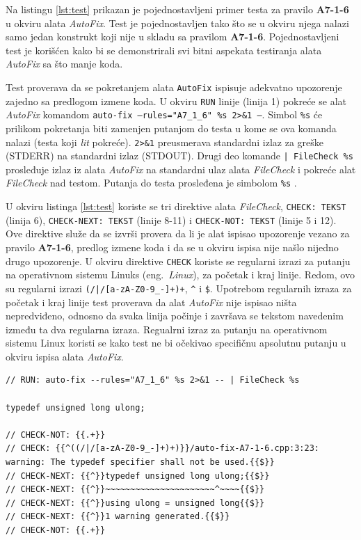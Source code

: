 \documentclass[12pt,oneside]{memoir}
\begin{document}
Na listingu \ref{lst:test} prikazan je pojednostavljeni primer testa za pravilo \textbf{A7-1-6} u okviru alata \textit{AutoFix}. Test je pojednostavljen tako \v{s}to se u okviru njega nalazi samo jedan konstrukt koji nije u skladu sa pravilom \textbf{A7-1-6}. Pojednostavljeni test je kori\v{s}\'{c}en kako bi se demonstrirali svi bitni aspekata testiranja alata \textit{AutoFix} sa \v{s}to manje koda. \par Test
proverava da se pokretanjem alata \texttt{AutoFix} ispisuje adekvatno upozorenje zajedno sa predlogom izmene koda. U okviru \texttt{RUN} linije (linija 1) pokre\'{c}e se alat \textit{AutoFix} komandom \texttt{auto-fix --rules="A7\_1\_6" \%s 2>\&1 --}. Simbol \texttt{\%s}  \'{c}e prilikom pokretanja biti zamenjen putanjom do testa u kome se ova komanda nalazi (testa koji \textit{lit} pokre\'{c}e). \texttt{2>\&1} preusmerava standardni izlaz za gre\v{s}ke (STDERR) na standardni izlaz (STDOUT). Drugi deo komande \texttt{| FileCheck \%s} prosleđuje izlaz iz alata \textit{AutoFix} na standardni ulaz alata \textit{FileCheck} i pokre\'{c}e alat \textit{FileCheck} nad testom. Putanja do testa prosleđena je simbolom \texttt{\%s} \cite{LIT}.

 U okviru listinga \ref{lst:test} koriste se tri direktive alata \textit{FileCheck}, \texttt{CHECK: TEKST} (linija 6), \texttt{CHECK-NEXT: TEKST} (linije 8-11) i \texttt{CHECK-NOT: TEKST} (linije 5 i 12). Ove direktive slu\v{z}e da se izvr\v{s}i provera da li je alat ispisao upozorenje vezano za pravilo \textbf{A7-1-6}, predlog izmene koda i da se u okviru ispisa nije na\v{s}lo nijedno drugo upozorenje. U okviru direktive \texttt{CHECK} koriste se regularni izrazi za putanju na operativnom sistemu Linuks (eng.~\textit{Linux}), za po\v{c}etak i kraj linije. Redom, ovo su regularni izrazi \lstinline[style=custombash]{(/|/[a-zA-Z0-9_-]+)+}, \lstinline[style=custombash]{^} i \lstinline[style=custombash]{$}. Upotrebom regularnih izraza za po\v{c}etak i kraj linije test proverava da alat \textit{AutoFix} nije ispisao ni\v{s}ta nepredviđeno, odnosno da svaka linija po\v{c}inje i zavr\v{s}ava se tekstom navedenim između ta dva regularna izraza. Regualrni izraz za putanju na operativnom sistemu Linux koristi se kako test ne bi o\v{c}ekivao specifi\v{c}nu apsolutnu putanju u okviru ispisa alata \textit{AutoFix}. 

\begin{lstlisting}[style=customc, caption={Pojednostavljeni primer testa za pravilo \textbf{A7-1-6} u okviru alata \textit{AutoFix}.},label={lst:test}]
// RUN: auto-fix --rules="A7_1_6" %s 2>&1 -- | FileCheck %s

typedef unsigned long ulong;

// CHECK-NOT: {{.+}}
// CHECK: {{^((/|/[a-zA-Z0-9_-]+)+)}}/auto-fix-A7-1-6.cpp:3:23: warning: The typedef specifier shall not be used.{{$}}
// CHECK-NEXT: {{^}}typedef unsigned long ulong;{{$}}
// CHECK-NEXT: {{^}}~~~~~~~~~~~~~~~~~~~~~~^~~~~{{$}}
// CHECK-NEXT: {{^}}using ulong = unsigned long{{$}}
// CHECK-NEXT: {{^}}1 warning generated.{{$}}
// CHECK-NOT: {{.+}}
\end{lstlisting}
\end{document}
